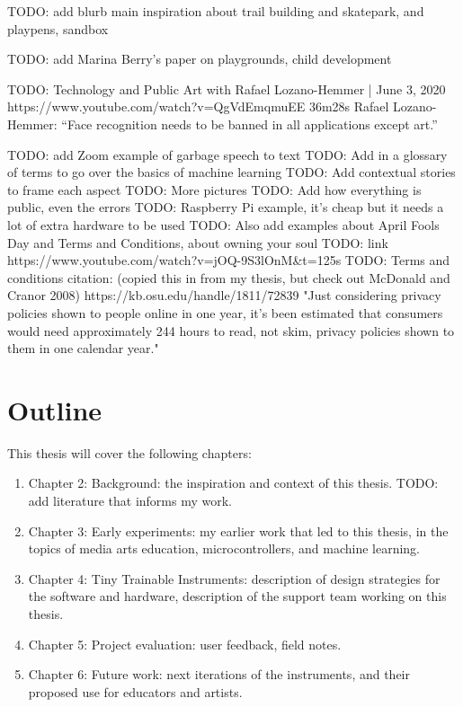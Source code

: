 TODO: add blurb main inspiration about trail building and skatepark, and playpens, sandbox

TODO: add Marina Berry’s paper on playgrounds, child development

TODO: Technology and Public Art with Rafael Lozano-Hemmer | June 3, 2020
https://www.youtube.com/watch?v=QgVdEmqmuEE
36m28s
Rafael Lozano-Hemmer: “Face recognition needs to be banned in all applications except art.”

TODO: add Zoom example of garbage speech to text
TODO: Add in a glossary of terms to go over the basics of machine learning
TODO: Add contextual stories to frame each aspect
TODO: More pictures
TODO: Add how everything is public, even the errors
TODO: Raspberry Pi example, it’s cheap but it needs a lot of extra hardware to be used
TODO: Also add examples about April Fools Day and Terms and Conditions, about owning your soul
TODO: link https://www.youtube.com/watch?v=jOQ-9S3lOnM\&t=125s
TODO: Terms and conditions citation: (copied this in from my thesis, but check out McDonald and Cranor 2008) https://kb.osu.edu/handle/1811/72839 "Just considering privacy policies shown to people online in one year, it's been estimated that consumers would need approximately 244 hours to read, not skim, privacy policies shown to them in one calendar year."


\section{Outline}

This thesis will cover the following chapters:

\begin{enumerate}
        \item Chapter 2: Background: the inspiration and context of this thesis. TODO: add literature that informs my work.
    \item Chapter 3: Early experiments: my earlier work that led to this thesis, in the topics of media arts education, microcontrollers, and machine learning.
    \item Chapter 4: Tiny Trainable Instruments: description of design strategies for the software and hardware, description of the support team working on this thesis.
    \item Chapter 5: Project evaluation: user feedback, field notes.
    \item Chapter 6: Future work: next iterations of the instruments, and their proposed use for educators and artists.
  \end{enumerate}
